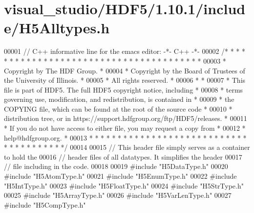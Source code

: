\hypertarget{visual__studio_2_h_d_f5_21_810_81_2include_2_h5_alltypes_8h_source}{}\section{visual\+\_\+studio/\+H\+D\+F5/1.10.1/include/\+H5\+Alltypes.h}
\label{visual__studio_2_h_d_f5_21_810_81_2include_2_h5_alltypes_8h_source}

\begin{DoxyCode}
00001 \textcolor{comment}{// C++ informative line for the emacs editor: -*- C++ -*-}
00002 \textcolor{comment}{/* * * * * * * * * * * * * * * * * * * * * * * * * * * * * * * * * * * * * * *}
00003 \textcolor{comment}{ * Copyright by The HDF Group.                                               *}
00004 \textcolor{comment}{ * Copyright by the Board of Trustees of the University of Illinois.         *}
00005 \textcolor{comment}{ * All rights reserved.                                                      *}
00006 \textcolor{comment}{ *                                                                           *}
00007 \textcolor{comment}{ * This file is part of HDF5.  The full HDF5 copyright notice, including     *}
00008 \textcolor{comment}{ * terms governing use, modification, and redistribution, is contained in    *}
00009 \textcolor{comment}{ * the COPYING file, which can be found at the root of the source code       *}
00010 \textcolor{comment}{ * distribution tree, or in https://support.hdfgroup.org/ftp/HDF5/releases.  *}
00011 \textcolor{comment}{ * If you do not have access to either file, you may request a copy from     *}
00012 \textcolor{comment}{ * help@hdfgroup.org.                                                        *}
00013 \textcolor{comment}{ * * * * * * * * * * * * * * * * * * * * * * * * * * * * * * * * * * * * * * */}
00014 
00015 \textcolor{comment}{// This header file simply serves as a container to hold the}
00016 \textcolor{comment}{// header files of all datatypes.  It simplifies the header}
00017 \textcolor{comment}{// file including in the code.}
00018 
00019 \textcolor{preprocessor}{#include "H5DataType.h"}
00020 \textcolor{preprocessor}{#include "H5AtomType.h"}
00021 \textcolor{preprocessor}{#include "H5EnumType.h"}
00022 \textcolor{preprocessor}{#include "H5IntType.h"}
00023 \textcolor{preprocessor}{#include "H5FloatType.h"}
00024 \textcolor{preprocessor}{#include "H5StrType.h"}
00025 \textcolor{preprocessor}{#include "H5ArrayType.h"}
00026 \textcolor{preprocessor}{#include "H5VarLenType.h"}
00027 \textcolor{preprocessor}{#include "H5CompType.h"}
\end{DoxyCode}
